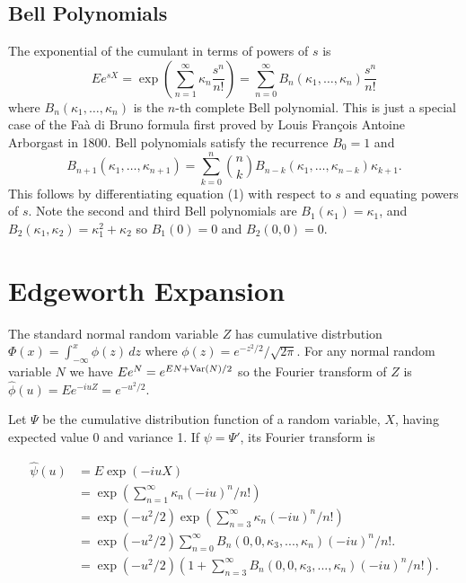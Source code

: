 \documentclass[fleqn]{amsart}
\newcommand{\Var}{\mathop{\rm{Var}}}
\theoremstyle{definition}
\begin{document}
\subsection{Bell Polynomials}

The exponential of the cumulant in terms of
powers of \(s\) is
\begin{equation}
Ee^{sX} =  \exp(\sum_{n=1}^\infty \kappa_n \frac{s^n}{n!})
= \sum_{n=0}^\infty B_n(\kappa_1,\dots,\kappa_n) \frac{s^n}{n!}
\end{equation}\label{eq:1}
where \(B_n(\kappa_1,\dots,\kappa_n)\) is the \(n\)-th complete
Bell polynomial.
This is just a special case of the
Fa\`a di Bruno formula first proved by Louis Fran\c{c}ois Antoine
Arborgast in 1800\cite{Arb1800}.
Bell polynomials satisfy the recurrence \cite{Com1974} \(B_0 = 1\) and
\[
B_{n+1}(\kappa_1,\dots,\kappa_{n+1}) = \sum_{k=0}^n \binom{n}{k}
B_{n - k}(\kappa_1,\dots, \kappa_{n - k}) \kappa_{k+1}.
\]
This follows by differentiating equation (1) with respect to \(s\) and equating powers of \(s\).
Note the second and third Bell polynomials are \(B_1(\kappa_1) = \kappa_1\), and
\(B_2(\kappa_1, \kappa_2) = \kappa_1^2 + \kappa_2\) so \(B_1(0) = 0\) and \(B_2(0,0) = 0\).

\section{Edgeworth Expansion}
The standard normal random variable \(Z\) has cumulative distrbution \(\Phi(x) = \int_{-\infty}^x \phi(z)\,dz\) where \(\phi(z) =e^{-z^2/2}/\sqrt{2\pi}\). 
For any normal random variable \(N\) we have \(Ee^N = e^{EN + \Var(N)/2}\)
so the Fourier transform of \(Z\) is \(\hat{\phi}(u) = Ee^{-iuZ} = e^{-u^2/2}\).

Let $\Psi$ be the cumulative distribution function of a random variable, $X$,
having expected value 0 and variance 1.
If \(\psi = \Psi'\), its Fourier transform is

\begin{align*}
\hat{\psi}(u) &= E \exp(-iuX) \\
     &= \exp(\sum_{n=1}^\infty \kappa_n (-iu)^n/n!)\\
     &= \exp(-u^2/2) \exp(\sum_{n=3}^\infty \kappa_n (-iu)^n/n!)\\
    &= \exp(-u^2/2) \sum_{n=0}^\infty B_n(0, 0, \kappa_3,...,\kappa_n)(-iu)^n/n!.\\
	  &= \exp(-u^2/2) (1 + \sum_{n=3}^\infty B_n(0, 0, \kappa_3,...,\kappa_n)(-iu)^n/n!).\\
\end{align*}
\end{document}
